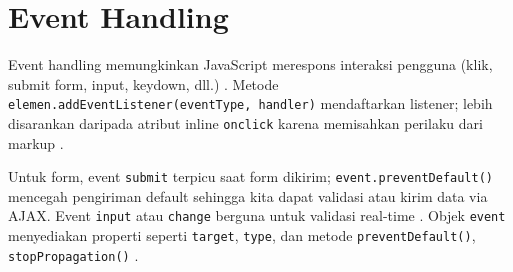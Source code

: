 \section{Event Handling}

Event handling memungkinkan JavaScript merespons interaksi pengguna (klik, submit form, input, keydown, dll.) \cite{mdn-learn-js}. Metode \texttt{elemen.addEventListener(eventType, handler)} mendaftarkan listener; lebih disarankan daripada atribut inline \texttt{onclick} karena memisahkan perilaku dari markup \cite{js-info}.

Untuk form, event \texttt{submit} terpicu saat form dikirim; \texttt{event.preventDefault()} mencegah pengiriman default sehingga kita dapat validasi atau kirim data via AJAX. Event \texttt{input} atau \texttt{change} berguna untuk validasi real-time \cite{mdn-learn-js}. Objek \texttt{event} menyediakan properti seperti \texttt{target}, \texttt{type}, dan metode \texttt{preventDefault()}, \texttt{stopPropagation()} \cite{eloquent-js}.
